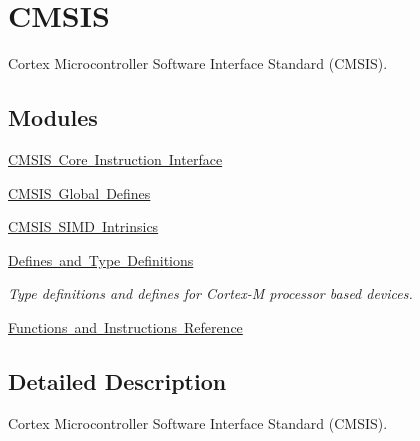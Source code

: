 \hypertarget{group__CMSIS}{}\section{C\+M\+S\+IS}
\label{group__CMSIS}


Cortex Microcontroller Software Interface Standard (C\+M\+S\+IS).  


\subsection*{Modules}
\begin{DoxyCompactItemize}
\item 
\mbox{\hyperlink{group__CMSIS__Core__InstructionInterface}{C\+M\+S\+I\+S Core Instruction Interface}}
\item 
\mbox{\hyperlink{group__CMSIS__glob__defs}{C\+M\+S\+I\+S Global Defines}}
\item 
\mbox{\hyperlink{group__CMSIS__SIMD__intrinsics}{C\+M\+S\+I\+S S\+I\+M\+D Intrinsics}}
\item 
\mbox{\hyperlink{group__CMSIS__core__register}{Defines and Type Definitions}}
\begin{DoxyCompactList}\small\item\em Type definitions and defines for Cortex-\/M processor based devices. \end{DoxyCompactList}\item 
\mbox{\hyperlink{group__CMSIS__Core__FunctionInterface}{Functions and Instructions Reference}}
\end{DoxyCompactItemize}


\subsection{Detailed Description}
Cortex Microcontroller Software Interface Standard (C\+M\+S\+IS). 

